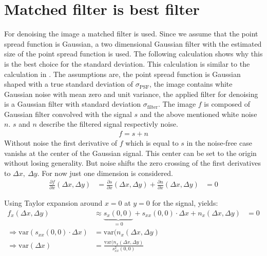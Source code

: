 \section{Matched filter is best filter} \label{detectionError}
For denoising the image a matched filter is used. Since we assume that the point spread function is Gaussian, a two dimensional Gaussian filter with the estimated size of the point spread function is used. The following calculation shows why this is the best choice for the standard deviation.\newline
This calculation is similar to the calculation in \cite{ulli}. The assumptions are, the point spread function is Gaussian shaped with a true standard deviation of $\sigma_\text{PSF}$, the image contains white Gaussian noise with mean zero and unit variance, the applied filter for denoising is a Gaussian filter with standard deviation $\sigma_\text{filter}$.\newline
The image $f$ is composed of Gaussian filter convolved with the signal $s$ and the above mentioned white noise $n$. $s$ and $n$ describe the filtered signal respectivly noise.
\begin{align}
 f=s+n \label{gl91}
\end{align}
Without noise the first derivative of $f$ which is equal to $s$ in the noise-free case vanishs at the center of the Gaussian signal. This center can be set to the origin without losing generality. But noise shifts the zero crossing of the first derivatives to $\Delta x,~\Delta y$. For now just one dimension is considered.
\begin{align}
\frac{\partial f}{\partial x}\left(\Delta x, \Delta y\right) &= \frac{\partial s}{\partial x} \left(\Delta x, \Delta y\right) + \frac{\partial n}{\partial x}\left(\Delta x, \Delta y\right)&=0
\end{align}  

Using Taylor expansion around $x = 0$ at $y= 0$ for the signal, yields:
\begin{align}
f_x(\Delta x, \Delta y)&\approx \underbrace{s_x(0, 0)}_{=0} + s_{xx}(0, 0)\cdot \Delta x + n_x(\Delta x, \Delta y)&=0\\
\Rightarrow \text{var}(s_{xx}(0, 0)\cdot \Delta x)&= \text{var}(n_x(\Delta x,\Delta y)\\
\Rightarrow \text{var}(\Delta x) &= \frac{\text{var}(n_x(\Delta x, \Delta y)}{s_{xx}^2(0, 0)} \label{ch9gl1}
\end{align}

